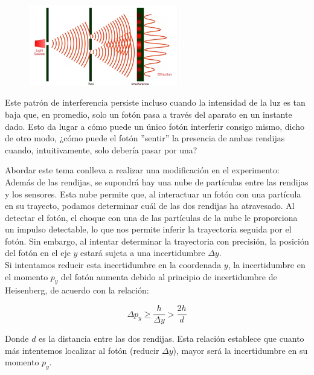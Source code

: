 \documentclass[a4paper]{article}
\begin{document}
    \begin{figure}[h!]
        \centering
        \includegraphics[width = 6.5cm]{../imagenes/expDOPColor.png}
    \end{figure}

    \indent Este patrón de interferencia persiste incluso cuando la intensidad de la luz es tan baja que, en promedio, solo un fotón pasa a través del aparato en un instante dado. Esto da lugar a cómo puede un único fotón interferir consigo mismo, dicho de otro modo, ¿cómo puede el fotón ''sentir'' la presencia de ambas rendijas cuando, intuitivamente, solo debería pasar por una? \\

    \newpage
    \noindent
    \thispagestyle{fancy}

    \indent Abordar este tema conlleva a realizar una modificación en el experimento: Además de las rendijas, se supondrá hay una nube de partículas entre las rendijas y los sensores. Esta nube permite que, al interactuar un fotón con una partícula en su trayecto, podamos determinar cuál de las dos rendijas ha atravesado. Al detectar el fotón, el choque con una de las partículas de la nube le proporciona un impulso detectable, lo que nos permite inferir la trayectoria seguida por el fotón. Sin embargo, al intentar determinar la trayectoria con precisión, la posición del fotón en el eje $y$ estará sujeta a una incertidumbre $\Delta y$.\\

    \indent Si intentamos reducir esta incertidumbre en la coordenada $y$, la incertidumbre en el momento $p_y$ del fotón aumenta debido al principio de incertidumbre de Heisenberg, de acuerdo con la relación:

    \begin{equation}
        \Delta p_y \geq \frac{h}{\Delta y} > \frac{2h}{d} \tag*{}
    \end{equation}

    \indent Donde $d$ es la distancia entre las dos rendijas. Esta relación establece que cuanto más intentemos localizar al fotón (reducir $\Delta y$), mayor será la incertidumbre en su momento $p_y$. \\
\end{document}
